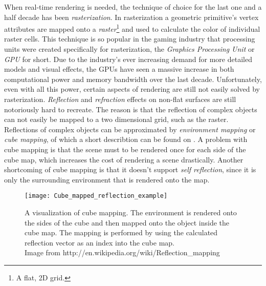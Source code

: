 When real-time rendering is needed, the technique of choice for the last one and
a half decade has been \textit{rasterization}. In rasterization a geometric
primitive's vertex attributes are mapped onto a \textit{raster}\footnote{A flat,
  2D grid.} and used to calculate the color of individual raster cells. This
technique is so popular in the gaming industry that processing units were
created specifically for rasterization, the \textit{Graphics Processing Unit} or
\textit{GPU} for short. Due to the industry's ever increasing demand for more
detailed models and visual effects, the GPUs have seen a massive increase in
both computational power and memory bandwidth over the last
decade. Unfortunately, even with all this power, certain aspects of rendering are
still not easily solved by rasterization. \textit{Reflection} and
\textit{refraction} effects on non-flat surfaces are still notoriously hard to
recreate. The reason is that the reflection of complex objects can not easily be
mapped to a two dimensional grid, such as the raster. Reflections of complex
objects can be approximated by \textit{environment mapping} or \textit{cube
  mapping}, of which a short describtion can be found on . A
problem with cube mapping is that the scene must to be rendered once for each
side of the cube map, which increases the cost of rendering a scene
drastically. Another shortcoming of cube mapping is that it doesn't support
\textit{self reflection}, since it is only the surrounding environment that is
rendered onto the map.

\begin{figure}
  \centering
  \texttt{[image: Cube\_mapped\_reflection\_example]}

  \vspace{3mm}
  \parbox{9.5cm}{\caption[Cube mapping visualized.]{A visualization of cube
      mapping. The environment is rendered onto the sides of the cube and then
      mapped onto the object inside the cube map. The mapping is performed by
      using the calculated reflection vector as an index into the cube
      map.\\Image from
      http://en.wikipedia.org/wiki/Reflection\_mapping}\label{fig:cubemap}}
\end{figure}


